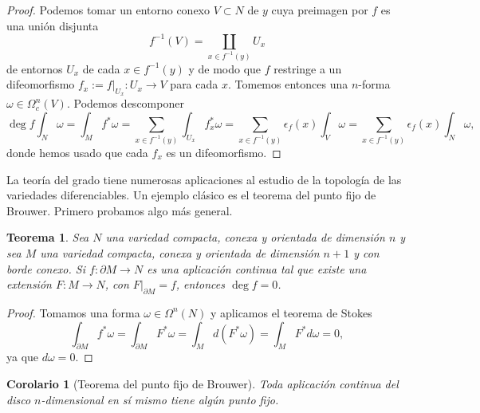\documentclass[11pt,a4paper]{amsbook}
\newtheorem{thm}[subsection]{Teorema}
\newtheorem{corol}[subsection]{Corolario}
\theoremstyle{remark} \newtheorem{rmk}[subsection]{Observación}
\theoremstyle{definition} \newtheorem{defn}[subsection]{Definición}
\theoremstyle{definition} \newtheorem{ex}[subsection]{Ejemplo}
\theoremstyle{definition} \newtheorem{ej}[subsection]{Ejercicio}
\begin{document}
\begin{proof}
  Podemos tomar un entorno conexo $V\subset N$ de $y$ cuya preimagen por $f$ es una unión disjunta
  \begin{equation*}
f^{-1}(V) = \coprod_{x\in f^{-1}(y)} U_x
  \end{equation*}
  de entornos $U_x$ de cada $x\in f^{-1}(y)$ y de modo que $f$ restringe a un difeomorfismo $f_x:=f|_{U_x}:U_x\rightarrow V$ para cada $x$. Tomemos entonces una $n$-forma $\omega \in \Omega_c^n(V)$.  Podemos descomponer
  \begin{equation*}
\deg f \int_N \omega=\int_M f^* \omega = \sum_{x\in f^{-1}(y)} \int_{U_x} f_x^* \omega  = \sum_{x\in f^{-1}(y)} \epsilon_f(x) \int_V \omega = \sum_{x\in f^{-1}(y)} \epsilon_f(x) \int_N \omega ,
  \end{equation*}
  donde hemos usado que cada $f_x$ es un difeomorfismo.
\end{proof}

La teoría del grado tiene numerosas aplicaciones al estudio de la topología de las variedades diferenciables. Un ejemplo clásico es el teorema del punto fijo de Brouwer. Primero probamos algo más general.

\begin{thm}
Sea $N$ una variedad compacta, conexa y orientada de dimensión $n$ y sea $M$ una variedad compacta, conexa y orientada de dimensión $n+1$ y con borde conexo. Si $f:\partial M \rightarrow N$ es una aplicación continua tal que existe una extensión $F:M\rightarrow N$, con $F|_{\partial M} = f$, entonces $\deg f = 0$.
\end{thm}

\begin{proof}
  Tomamos una forma $\omega \in \Omega^n(N)$ y aplicamos el teorema de Stokes
  \begin{equation*}
\int_{\partial M} f^* \omega = \int_{\partial M} F^* \omega = \int_M d(F^* \omega) = \int_M F^* d\omega = 0,
  \end{equation*}
  ya que $d\omega = 0$.
\end{proof}

\begin{corol}[Teorema del punto fijo de Brouwer]
Toda aplicación continua del disco $n$-dimensional en sí mismo tiene algún punto fijo.
\end{corol}
\end{document}
